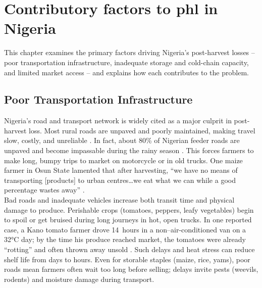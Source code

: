 \chapter[Causes Of PHL]{Contributory factors to \acrshort{phl} in Nigeria}
\label{cp:causes-of-phl}

{
\parindent0pt





\vspace{.935em}
 This chapter examines the primary factors driving Nigeria’s post-harvest losses – poor transportation infrastructure, inadequate storage and cold-chain capacity, and limited market access – and explains how each contributes to the problem.

 \section{Poor Transportation Infrastructure}
Nigeria’s road and transport network is widely cited as a major culprit in post-harvest loss. Most rural roads are unpaved and poorly maintained, making travel slow, costly, and unreliable \citep{PinnacleTimes2024, VoiceofNigeria2023}. In fact, about 80\% of Nigerian feeder roads are unpaved and become impassable during the rainy season \citep{PinnacleTimes2024}. This forces farmers to make long, bumpy trips to market on motorcycle or in old trucks. One maize farmer in Osun State lamented that after harvesting, “we have no means of transporting [products] to urban centres…we eat what we can while a good percentage wastes away” \citep{PinnacleTimes2024}.
\\

Bad roads and inadequate vehicles increase both transit time and physical damage to produce. Perishable crops (tomatoes, peppers, leafy vegetables) begin to spoil or get bruised during long journeys in hot, open trucks. In one reported case, a Kano tomato farmer drove 14 hours in a non–air-conditioned van on a 32°C day; by the time his produce reached market, the tomatoes were already “rotting” and often thrown away unsold \citep{Ikegwuonu2018}.
Such delays and heat stress can reduce shelf life from days to hours. Even for storable staples (maize, rice, yams), poor roads mean farmers often wait too long before selling; delays invite pests (weevils, rodents) and moisture damage during transport.
\\

}

